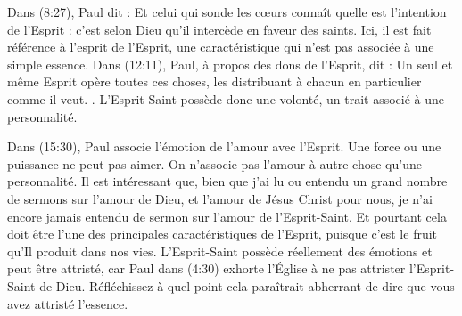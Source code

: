 Dans (8:27), Paul dit : \og Et celui qui sonde les cœurs connaît quelle est l'intention de l'Esprit : c'est selon Dieu qu'il intercède en faveur des saints. \fg{} Ici, il est fait référence à l'esprit  de l'Esprit, une caractéristique qui n'est pas associée à une simple essence. Dans (12:11), Paul, à propos des dons de l'Esprit, dit : \og Un seul et même Esprit opère toutes ces choses, les distribuant à chacun en particulier comme il veut. \fg{}. L'Esprit-Saint possède donc une volonté, un trait associé à une personnalité.

Dans (15:30), Paul associe l'émotion de l'amour avec l'Esprit. Une force ou une puissance ne peut pas aimer. On n'associe pas l'amour à autre chose qu'une personnalité. Il est intéressant que, bien que j'ai lu ou entendu un grand nombre de sermons sur l'amour de Dieu, et l'amour de Jésus Christ pour nous, je n'ai encore jamais entendu de sermon sur l'amour de l'Esprit-Saint. Et pourtant cela doit être l'une des principales caractéristiques de l'Esprit, puisque c'est le fruit qu'Il produit dans nos vies. L'Esprit-Saint possède réellement des émotions et peut être attristé, car Paul dans (4:30) exhorte l'Église à ne pas attrister l'Esprit-Saint de Dieu. Réfléchissez à quel point cela paraîtrait abherrant de dire que vous avez attristé l'essence.


